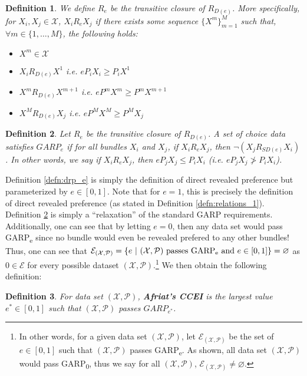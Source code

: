 \documentclass{article} %
\theoremstyle{style1}
\newtheorem{definition}{Definition} %
\theoremstyle{example}
\begin{document}
\begin{definition}\label{defn:rp_e}\leavevmode
We define $R_e$ be the transitive closure of $R_{D(e)}$. More specifically, for $X_i,X_j\in\mathcal{X}$, $X_iR_eX_j$ if there exists some sequence $\{X^m\}_{m=1}^M$ such that, $\forall m\in\{1,\ldots,M\}$, the following holds:
\begin{itemize}[topsep=0pt]
  \item $X^m\in\mathcal{X}$
  \item $X_i R_{D(e)} X^1$ i.e. $eP_iX_i\geq P_i X^1$
  \item $X^m R_{D(e)} X^{m+1}$ i.e. $e P^m X^m \geq P^m X^{m+1}$
  \item $X^M R_{D(e)}X_j$ i.e. $e P^M X^M\geq P^M X_j$
\end{itemize}  
\end{definition}

\begin{definition}\label{defn:GARPe}
Let $R_e$ be the transitive closure of $R_{D(e)}$. A set of choice data satisfies $GARP_e$ if for all bundles $X_i$ and $X_j$, if $X_i R_e X_j$, then $\neg (X_j R_{SD(e)} X_i)$. In other words, we say if $X_i R_e X_j$, then $eP_jX_j \leq P_iX_i$ (i.e. $eP_jX_j \not> P_iX_i$).
\end{definition}
Definition \ref{defn:drp_e} is simply the definition of direct revealed preference but parameterized by $e\in[0,1]$. Note that for $e=1$, this is precisely the definition of direct revealed preference (as stated in Definition \ref{defn:relations_1}). Definition \ref{defn:GARPe} is simply a ``relaxation'' of the standard GARP requirements. Additionally, one can see that by letting $e=0$, then any data set would pass GARP\textsubscript{e} since no bundle would even be revealed prefered to any other bundles! Thus, one can see that $\mathcal{E}_{(\mathcal{X},\mathcal{P})}=\{e\ |\ (\mathcal{X},\mathcal{P})\textrm{ passes GARP\textsubscript{e}}\textrm{ and } e\in[0,1]\}=\varnothing$ as $0\in\mathcal{E}$ for every possible dataset $(\mathcal{X},\mathcal{P})$.\footnote{In other words, for a given data set $(\mathcal{X},\mathcal{P})$, let $\mathcal{E}_{(\mathcal{X},\mathcal{P})}$ be the set of $e\in[0,1]$ such that $(\mathcal{X},\mathcal{P})$ passes GARP\textsubscript{e}. As shown, all data set $(\mathcal{X},\mathcal{P})$ would pass GARP\textsubscript{0}, thus we say for all $(\mathcal{X},\mathcal{P})$, $\mathcal{E}_{(\mathcal{X},\mathcal{P})}\not=\varnothing$.} We then obtain the following definition:

\begin{definition}\label{defn:Afriat_CCEI}
For data set $(\mathcal{X},\mathcal{P})$, \textbf{Afriat's CCEI} is the \emph{largest} value $e^*\in[0,1]$ such that $(\mathcal{X},\mathcal{P})$ passes $GARP_{e^*}$.
\end{definition}
\end{document}

